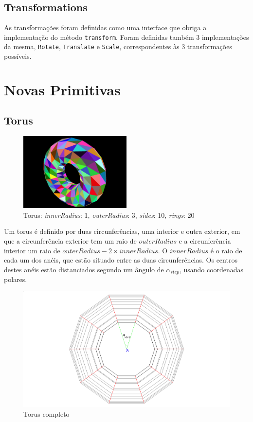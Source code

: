 \documentclass[a4paper]{article}
\newcommand{\x}{\times}
\begin{document}
\subsection{Transformations}

As transformações foram definidas como uma interface que obriga a
implementação do método \texttt{transform}. Foram definidas também 3 implementações
da mesma, \texttt{Rotate}, \texttt{Translate} e \texttt{Scale}, correspondentes
às 3 transformações possíveis.

\section{Novas Primitivas}

\subsection{Torus}

\begin{figure}[H]
    \centering 
    \includegraphics[width=0.5\textwidth]{torus.png}
    \caption{Torus: \textit{innerRadius}: 1, \textit{outerRadius}: 3, \textit{sides}: 10, \textit{rings}: 20}
\end{figure}

Um torus é definido por duas circunferências, uma interior e outra exterior, em
que a circunferência exterior tem um raio de $outerRadius$ e a circunferência interior um raio
de $outerRadius - 2 \x innerRadius$.
O $innerRadius$ é o raio de cada um dos anéis, que estão situado entre as duas circunferências. Os
centros destes anéis estão distanciados segundo um ângulo de $\alpha_{step}$,
usando coordenadas polares.

\begin{figure}[H]
    \centering
    \includegraphics{torus_diagram_full.png}
    \caption{Torus completo}
\end{figure}
\end{document}
